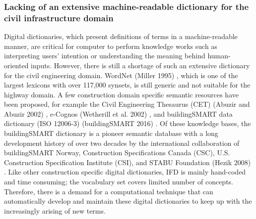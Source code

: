 \documentclass[Journal, InsideFigs, DoubleSpace]{ascelike} %
\begin{document}
\subsubsection{Lacking of an extensive machine-readable dictionary for the civil infrastructure domain}
Digital dictionaries, which present definitions of terms in a machine-readable manner, are critical for computer to perform knowledge works such as interpreting users’ intention or understanding the meaning behind human-oriented inputs. However, there is still a shortage of such an extensive dictionary for the civil engineering domain. WordNet (Miller 1995) \cite{miller95}, which is one of the largest lexicons with over 117,000 synsets, is still generic and not suitable for the highway domain. A few construction domain specific semantic resources have been proposed, for example the Civil Engineering Thesaurus (CET) (Abuzir and Abuzir 2002) \cite{abuzir02}, e-Cognos (Wetherill et al. 2002) \cite{wetherill02}, and buildingSMART data dictionary (ISO 12006-3) (buildingSMART 2016)\cite{buildingsmartData} . Of these knowledge bases, the buildingSMART dictionary is a pioneer semantic database with a long development history of over two decades by the international collaboration of buildingSMART Norway, Construction Specifications Canada (CSC), U.S. Construction Specification Institute (CSI), and STABU Foundation (Hezik 2008) \cite{hezik08}. Like other construction specific digital dictionaries, IFD is mainly hand-coded and time consuming; the vocabulary set covers limited number of concepts. Therefore, there is a demand for a computational technique that can automatically develop and maintain these digital dictionaries to keep up with the increasingly arising of new terms. 
%
\end{document}
